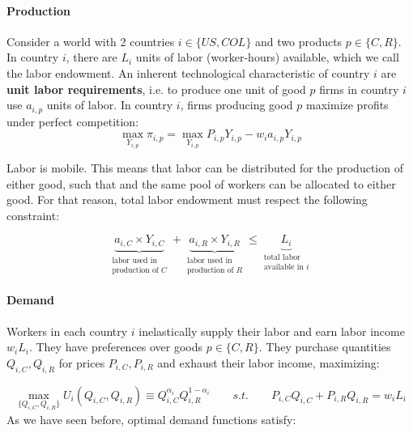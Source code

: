 \documentclass[11pt,letterpaper]{article}
\begin{document}
\paragraph{Production} Consider a world with 2 countries $i \in \{ US, COL\}$ and two products $p \in \{ C, R\}$. In country $i$, there are $L_i$ units of labor (worker-hours) available, which we call the labor endowment. An inherent technological characteristic of country $i$ are \textbf{unit labor requirements}, i.e. to produce one unit of good $p$ firms in country $i$ use $a_{i,p}$ units of labor. In country $i$, firms producing good $p$ maximize profits under perfect competition:
        \begin{equation}\label{eq: production}
            \max_{Y_{i,p}} \pi_{i,p} = \max_{Y_{i,p}} P_{i,p}Y_{i,p} - w_i a_{i,p} Y_{i,p} 
        \end{equation}

Labor is mobile. This means that labor can be distributed for the production of either good, such that and the same pool of workers can be allocated to either good. For that reason, total labor endowment must respect the following constraint:

\begin{equation}\label{eq: ppf-inequality}
    \underbrace{a_{i,C} \times Y_{i,C}}_{\substack{\text{labor used in} \\ \text{production of } C}} + \underbrace{a_{i,R} \times Y_{i,R}}_{\substack{\text{labor used in} \\ \text{production of } R}} \le \underbrace{L_i}_{\substack{\text{total labor} \\ \text{available in } i}}
\end{equation}


\paragraph{Demand} Workers in each country $i$ inelastically supply their labor and earn labor income $w_i L_i$. They have preferences over goods $p \in \{ C, R\}$. They purchase quantities $Q_{i,C}, Q_{i,R}$ for prices $P_{i,C}, P_{i,R}$ and exhaust their labor income, maximizing:

\begin{equation*}
    \max_{\{Q_{i,C}, Q_{i,R}\}} U_i(Q_{i,C}, Q_{i,R}) \equiv Q_{i,C}^{\alpha_i} Q_{i,R}^{1-\alpha_i} \qquad s.t. \qquad P_{i,C} Q_{i,C} + P_{i,R} Q_{i,R} = w_i L_i
\end{equation*}
As we have seen before, optimal demand functions satisfy:
\end{document}
